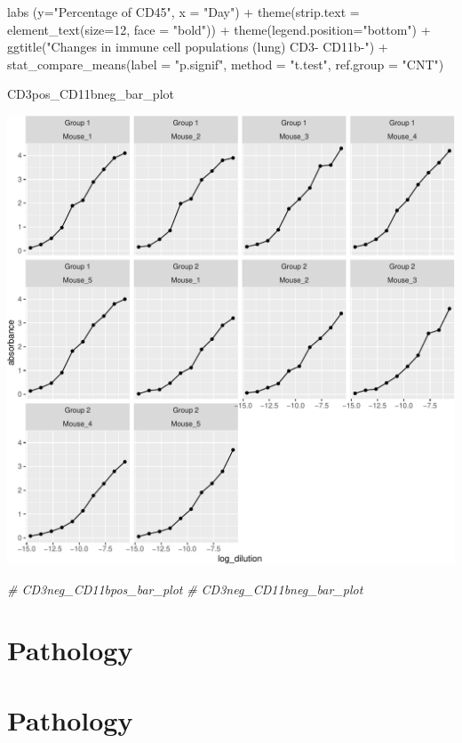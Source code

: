 \documentclass[
]{book}
\newenvironment{Shaded}{\begin{snugshade}}{\end{snugshade}}
\newcommand{\AttributeTok}[1]{\textcolor[rgb]{0.77,0.63,0.00}{#1}}
\newcommand{\CommentTok}[1]{\textcolor[rgb]{0.56,0.35,0.01}{\textit{#1}}}
\newcommand{\DecValTok}[1]{\textcolor[rgb]{0.00,0.00,0.81}{#1}}
\newcommand{\FunctionTok}[1]{\textcolor[rgb]{0.00,0.00,0.00}{#1}}
\newcommand{\NormalTok}[1]{#1}
\newcommand{\SpecialCharTok}[1]{\textcolor[rgb]{0.00,0.00,0.00}{#1}}
\newcommand{\StringTok}[1]{\textcolor[rgb]{0.31,0.60,0.02}{#1}}
\begin{document}
\begin{Shaded}
\begin{Highlighting}[]
  \FunctionTok{labs}\NormalTok{ (}\AttributeTok{y=}\StringTok{"Percentage of CD45"}\NormalTok{, }\AttributeTok{x =} \StringTok{"Day"}\NormalTok{) }\SpecialCharTok{+} 
  \FunctionTok{theme}\NormalTok{(}\AttributeTok{strip.text =} \FunctionTok{element\_text}\NormalTok{(}\AttributeTok{size=}\DecValTok{12}\NormalTok{, }\AttributeTok{face =} \StringTok{"bold"}\NormalTok{)) }\SpecialCharTok{+} \FunctionTok{theme}\NormalTok{(}\AttributeTok{legend.position=}\StringTok{"bottom"}\NormalTok{) }\SpecialCharTok{+}
  \FunctionTok{ggtitle}\NormalTok{(}\StringTok{"Changes in immune cell populations (lung) CD3{-} CD11b{-}"}\NormalTok{) }\SpecialCharTok{+}
  \FunctionTok{stat\_compare\_means}\NormalTok{(}\AttributeTok{label =} \StringTok{"p.signif"}\NormalTok{, }\AttributeTok{method =} \StringTok{"t.test"}\NormalTok{,}
                     \AttributeTok{ref.group =} \StringTok{"CNT"}\NormalTok{)}

\NormalTok{CD3pos\_CD11bneg\_bar\_plot}
\end{Highlighting}
\end{Shaded}

\includegraphics{csu-impactb_files/figure-latex/unnamed-chunk-50-1.pdf}

\begin{Shaded}
\begin{Highlighting}[]
\CommentTok{\# CD3neg\_CD11bpos\_bar\_plot}
\CommentTok{\# CD3neg\_CD11bneg\_bar\_plot}
\end{Highlighting}
\end{Shaded}

\hypertarget{pathology}{%
\chapter{Pathology}\label{pathology}}

\hypertarget{pathology-1}{%
\chapter{Pathology}\label{pathology-1}}

  
\end{document}

